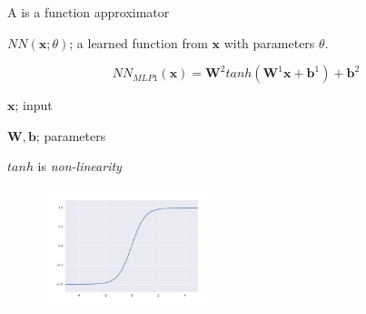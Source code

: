 \documentclass{beamer}
\let\tempone\itemize
\let\temptwo\enditemize
\newcommand{\din}{{d_{\mathrm{in}}}}
\newcommand{\dhid}{{d_{\mathrm{hid}}}}
\newcommand{\dout}{{d_{\mathrm{out}}}}
\renewenvironment{itemize}{\tempone\addtolength{\itemsep}{0.5\baselineskip}}{\temptwo}
\newcommand{\boldx}{\mathbf{x}}
\newcommand{\boldx}{\mathbf{x}}
\newcommand{\boldb}{\mathbf{b}}
\newcommand{\boldW}{\mathbf{W}}
\newcommand{\reals}{\ensuremath{\mathbb{R}}}
\begin{document}

\begin{frame}
  A  is a \alert{function approximator}

  
  \begin{itemize}
  \item  $NN(\boldx; \theta)$; a learned function from $\boldx$ with parameters $\theta$.
  \end{itemize}

  \pause

  \[NN_{MLP1}(\boldx) =  \boldW^2 tanh(\boldW^1 \boldx + \boldb^1) + \boldb^2\]
  \begin{itemize}
  \item $\boldx$; input

  \item $\boldW, \boldb$; parameters
  \item $tanh$ is \textit{non-linearity} 
  \end{itemize}
  \begin{figure}
    \centering
    \includegraphics[width=5cm]{tanh}     
  \end{figure}

\end{frame}
\end{document}
